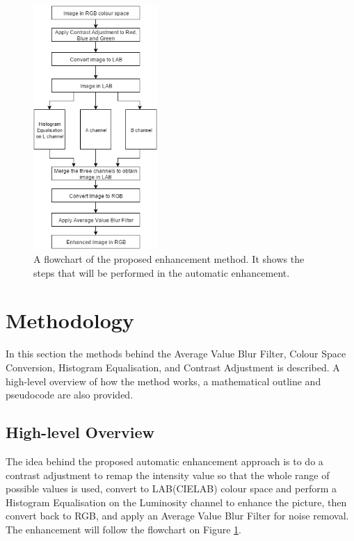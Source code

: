 \documentclass[journal,transmag]{IEEEtran}
\begin{document}
\begin{figure}[h!]
\centering
\includegraphics[width=0.42\textwidth]{figures/flowchart.png}
\caption{A flowchart of the proposed enhancement method. It shows the steps that will be performed in the automatic enhancement.}
\label{fig:flowchart}
\end{figure}

\section{Methodology}
\label{sec:methods}

In this section the methods behind the Average Value Blur Filter, Colour Space Conversion, Histogram Equalisation, and Contrast Adjustment is described. A high-level overview of how the method works, a mathematical outline and pseudocode are also provided.

\subsection{High-level Overview}
The idea behind the proposed automatic enhancement approach is to do a contrast adjustment to remap the intensity value so that the whole range of possible values is used, convert to LAB(CIELAB) colour space and perform a Histogram Equalisation on the Luminosity channel to enhance the picture\cite{labHistEqArticle}, then convert back to RGB, and apply an Average Value Blur Filter for noise removal. The enhancement will follow the flowchart on Figure \ref{fig:flowchart}.
\end{document}
